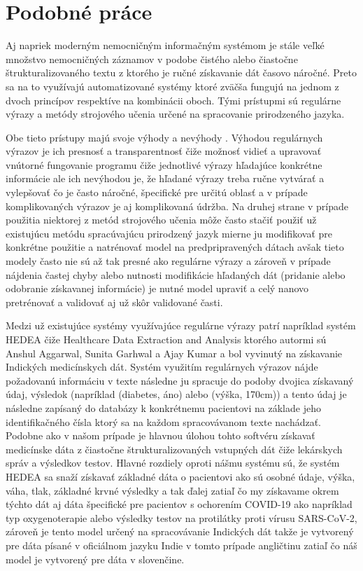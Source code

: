 \chapter{Podobné práce}

Aj napriek moderným nemocničným informačným
systémom je stále veľké množstvo nemocničných záznamov v
podobe čistého alebo čiastočne štrukturalizovaného 
textu z ktorého je ručné získavanie dát časovo náročné.
Preto sa na to využívajú automatizované systémy
ktoré zväčša fungujú na jednom z dvoch princípov 
respektíve na kombinácii oboch. Tými prístupmi
sú regulárne výrazy a metódy strojového učenia
určené na spracovanie prirodzeného jazyka.

Obe tieto prístupy majú svoje výhody a nevýhody \cite{nlpAndRegex}. 
Výhodou regulárnych výrazov je ich presnosť a 
transparentnosť čiže možnosť vidieť a upravovať
vnútorné fungovanie programu čiže jednotlivé výrazy
hľadajúce konkrétne informácie ale ich nevýhodou je,
že hľadané výrazy treba ručne vytvárať a vylepšovať
čo je často náročné, špecifické pre určitú oblasť
a v prípade komplikovaných výrazov je aj komplikovaná
údržba. Na druhej strane v prípade použitia niektorej
z metód strojového učenia môže často stačiť použiť už 
existujúcu metódu spracúvajúcu prirodzený jazyk mierne
ju modifikovať pre konkrétne použitie a natrénovať
model na predpripravených dátach avšak tieto modely
často nie sú až tak presné ako regulárne výrazy 
a zároveň v prípade nájdenia častej chyby alebo 
nutnosti modifikácie hľadaných dát (pridanie alebo 
odobranie získavanej informácie) je nutné model 
upraviť a celý nanovo pretrénovať a validovať aj už
skôr validované časti.

Medzi už existujúce systémy využívajúce regulárne
výrazy patrí napríklad systém HEDEA \cite{hedea} čiže 
Healthcare Data Extraction and Analysis ktorého
autormi sú Anshul Aggarwal, Sunita Garhwal a Ajay Kumar 
a bol vyvinutý na získavanie Indických medicínskych dát.
Systém využitím regulárnych výrazov nájde požadovanú informáciu 
v texte následne ju spracuje do podoby dvojica získavaný
údaj, výsledok (napríklad (diabetes, áno) alebo (výška, 170cm))
a tento údaj je následne zapísaný do databázy 
k konkrétnemu pacientovi na základe jeho identifikačného
čísla ktorý sa na každom spracovávanom texte nachádzať. 
Podobne ako v našom prípade je hlavnou úlohou tohto 
softvéru získavať medicínske dáta z čiastočne štrukturalizovaných
vstupných dát čiže lekárskych správ a výsledkov testov.
Hlavné rozdiely oproti nášmu systému sú, že systém HEDEA
sa snaží získavať základné dáta o pacientovi ako sú osobné
údaje, výška, váha, tlak, základné krvné výsledky a tak ďalej 
zatiaľ čo my získavame okrem týchto dát aj dáta 
špecifické pre pacientov s ochorením COVID-19 ako
napríklad typ oxygenoterapie alebo výsledky testov
na protilátky proti vírusu SARS-CoV-2, zároveň
je tento model určený na spracovávanie Indických dát
takže je vytvorený pre dáta písané v oficiálnom jazyku
Indie v tomto prípade angličtinu zatiaľ čo náš model
je vytvorený pre dáta v slovenčine.

